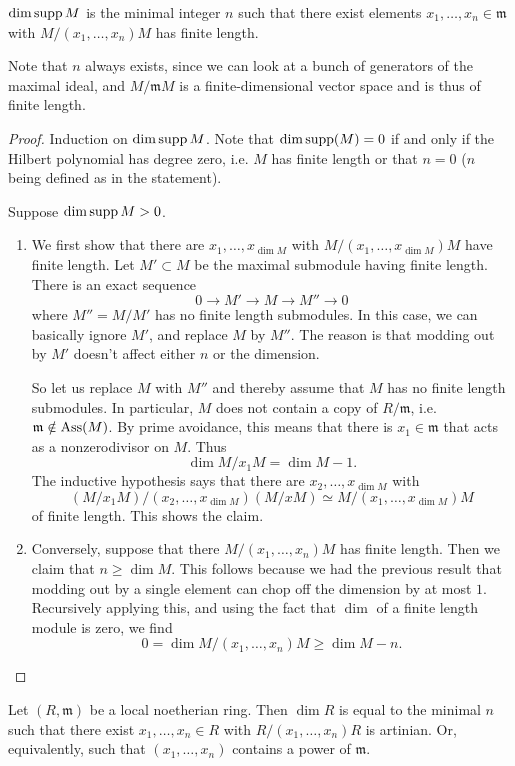 \begin{proposition} 
$\dim \operatorname{supp} M$ is the minimal integer $n$ such that there exist elements $x_1,
\dots, x_n \in \mathfrak{m}$ with $M/(x_1 , \dots, x_n) M$ has finite length. 
\end{proposition} 
Note that $n$ always exists, since we can look at a bunch of generators of the
maximal ideal, and $M/\mathfrak{m}M $ is a finite-dimensional vector space and
is thus of finite length.
\begin{proof} 
Induction on $\dim \operatorname{supp} M$. Note that $\dim \operatorname{supp}(M)=0$ if and only if the
Hilbert polynomial has degree zero, i.e. $M$ has finite length or that $n=0$
($n$ being defined as in the statement). 

Suppose $\dim \operatorname{supp} M > 0$. \begin{enumerate}
\item  We first show that there are $x_1, \dots, x_{\dim M}$
with $M/(x_1, \dots, x_{\dim M})M$ have finite length. 
Let $M' \subset M$ be the maximal submodule having finite length. There
is an exact sequence
\[ 0 \to M' \to M \to M'' \to 0  \]
where $M'' = M/M'$ has no finite length submodules. In this case, we can
basically ignore $M'$, and replace $M$ by $M''$. The reason is that modding out
by $M'$ doesn't affect either $n$ or the dimension. 

So let us replace $M$ with
$M''$ and thereby assume that $M$ has no finite length submodules. In
particular, $M$ does not contain a copy of $R/\mathfrak{m}$, i.e. $\mathfrak{m}
\notin \operatorname{Ass}(M)$. 
By prime avoidance, this means that there is $x_1 \in \mathfrak{m}$ that acts as
a nonzerodivisor on $M$. Thus
\[ \dim M/x_1M = \dim M -1.  \]
The inductive hypothesis says that there are $x_2, \dots, x_{\dim M}$ with
$$(M/x_1 M)/(x_2, \dots, x_{\dim M}) (M/xM) \simeq M/(x_1, \dots, x_{\dim M})M $$
of finite length. This shows the claim.
\item Conversely, suppose that there $M/(x_1, \dots, x_n)M$ has finite length.
Then we claim that $n \geq \dim M$. This follows because we had the previous
result that modding out by a single element can chop off the dimension by at
most $1$. Recursively applying this, and using the fact that $\dim$ of a
finite length module is zero, we find
\[ 0 = \dim M/(x_1 , \dots, x_n )M \geq \dim M -n. \]
\end{enumerate}
\end{proof} 


\begin{corollary} 
Let $(R, \mathfrak{m})$ be a local noetherian ring. Then $\dim R$ is equal to the minimal $n$
such that there exist $x_1, \dots, x_n \in R$ with $R/(x_1, \dots, x_n) R$ is
artinian. Or, equivalently, such that $(x_1, \dots, x_n)$ contains a power of
$\mathfrak{m}$.
\end{corollary}


